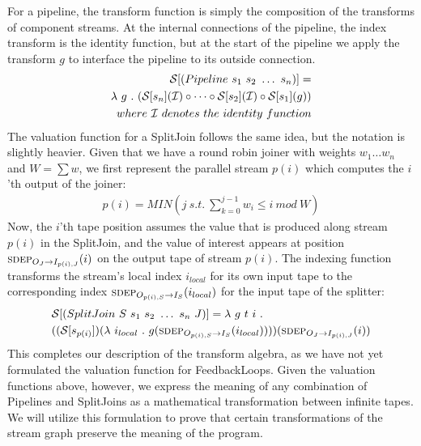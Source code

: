 For a pipeline, the transform function is simply the composition of the
transforms of component streams.  At the internal connections of the
pipeline, the index transform is the identity function, but at the start
of the pipeline we apply the transform $g$ to interface the pipeline to
its outside connection.
\begin{align*}
{\cal S} [(Pipeline~s_1~s_2~\dots~s_n)] = \\
\la~g~.~({\cal S}[s_n]({\cal I}) \circ \dots \circ {\cal S}[s_2]({\cal I}) \circ {\cal S}[s_1](g)) \\
where~{\cal I}~denotes~the~identity~function
\end{align*}
The valuation function for a SplitJoin follows the same idea, but the
notation is slightly heavier.  Given that we have a round robin joiner
with weights $w_1 \dots w_n$ and $W = \sum{w}$, we first represent the
parallel stream $p(i)$ which computes the $i$'th output of the
joiner:
\begin{align}
\label{eq:p}
p(i) = MIN(j~s.t.~\sum_{k=0}^{j-1}{w_i} \le i~mod~W)
\end{align}
Now, the $i$'th tape position assumes the value that is produced along
stream $p(i)$ in the SplitJoin, and the value of interest appears at
position $\mi{I_{p(i),J}}{O_J}(i)$ on the output tape of stream $p(i)$.
The indexing function transforms the stream's local index $i_{local}$
for its own input tape to the corresponding index
$\mi{I_S}{O_{p(i),S}}(i_{local})$ for the input tape of the splitter:
\begin{align*}
&{\cal S} [(SplitJoin~S~s_1~s_2~\dots~s_n~J)] = \la~g~t~i~.~ \\
&(({\cal S}[s_{p(i)}])(\la~i_{local}~.~g(\mi{I_S}{O_{p(i),S}}(i_{local}))))(\mi{I_{p(i),J}}{O_J}(i))
\end{align*}
This completes our description of the transform algebra, as we have
not yet formulated the valuation function for FeedbackLoops.  Given
the valuation functions above, however, we express the meaning of any
combination of Pipelines and SplitJoins as a mathematical
transformation between infinite tapes.  We will utilize this
formulation to prove that certain transformations of the stream graph
preserve the meaning of the program.

